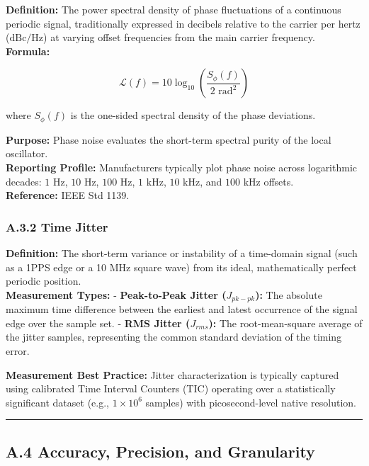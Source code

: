 \documentclass[
]{article}
\begin{document}
\textbf{Definition:} The power spectral density of phase fluctuations of
a continuous periodic signal, traditionally expressed in decibels
relative to the carrier per hertz (\(\text{dBc/Hz}\)) at varying offset
frequencies from the main carrier frequency.\\
\textbf{Formula:}

\[\mathcal{L}(f) = 10 \log_{10}\left( \frac{S_\phi(f)}{2\text{ rad}^2} \right)\]

where \(S_\phi(f)\) is the one-sided spectral density of the phase
deviations.

\textbf{Purpose:} Phase noise evaluates the short-term spectral purity
of the local oscillator.\\
\textbf{Reporting Profile:} Manufacturers typically plot phase noise
across logarithmic decades: \(1\text{ Hz}\), \(10\text{ Hz}\),
\(100\text{ Hz}\), \(1\text{ kHz}\), \(10\text{ kHz}\), and
\(100\text{ kHz}\) offsets.\\
\textbf{Reference:} IEEE Std 1139.

\subsubsection{A.3.2 Time Jitter}\label{a.3.2-time-jitter}

\textbf{Definition:} The short-term variance or instability of a
time-domain signal (such as a 1PPS edge or a 10 MHz square wave) from
its ideal, mathematically perfect periodic position.\\
\textbf{Measurement Types:} - \textbf{Peak-to-Peak Jitter
(\(J_{pk-pk}\)):} The absolute maximum time difference between the
earliest and latest occurrence of the signal edge over the sample set. -
\textbf{RMS Jitter (\(J_{rms}\)):} The root-mean-square average of the
jitter samples, representing the common standard deviation of the timing
error.

\textbf{Measurement Best Practice:} Jitter characterization is typically
captured using calibrated Time Interval Counters (TIC) operating over a
statistically significant dataset (e.g., \(1 \times 10^6\) samples) with
picosecond-level native resolution.

\begin{center}\rule{0.5\linewidth}{0.5pt}\end{center}

\subsection{A.4 Accuracy, Precision, and
Granularity}\label{a.4-accuracy-precision-and-granularity}
\end{document}
